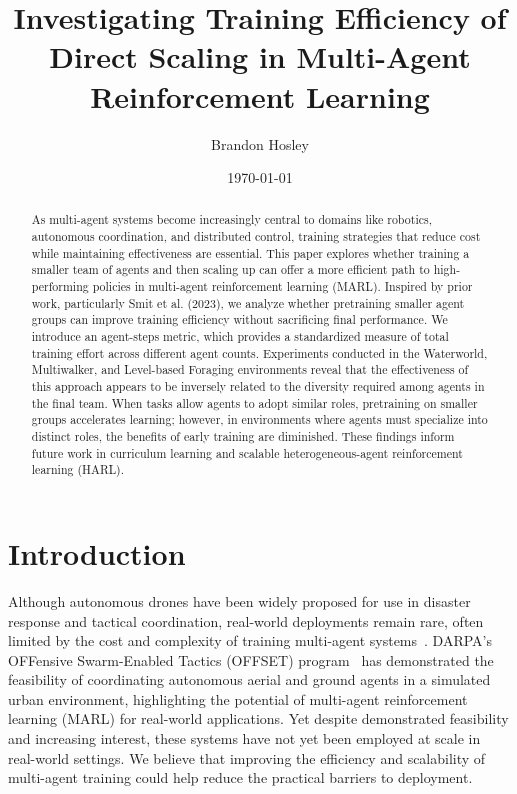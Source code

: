 \documentclass{article}
\title{Investigating Training Efficiency of Direct Scaling in Multi-Agent Reinforcement Learning}
\author{Brandon Hosley}
\date{\today}
\begin{document}
\maketitle

\begin{abstract}
    As multi-agent systems become increasingly central to domains like robotics, 
    autonomous coordination, and distributed control, training strategies 
    that reduce cost while maintaining effectiveness are essential. 
    This paper explores whether training a smaller team of agents and 
    then scaling up can offer a more efficient path to high-performing policies in 
    multi-agent reinforcement learning (MARL).
    Inspired by prior work, particularly Smit et al. (2023), 
    we analyze whether pretraining smaller agent groups can improve training efficiency 
    without sacrificing final performance. 
    We introduce an agent-steps metric, which provides a standardized measure of 
    total training effort across different agent counts.
    Experiments conducted in the Waterworld, Multiwalker, and Level-based Foraging environments 
    reveal that the effectiveness of this approach appears to be inversely related 
    to the diversity required among agents in the final team. 
    When tasks allow agents to adopt similar roles, 
    pretraining on smaller groups accelerates learning; 
    however, in environments where agents must specialize into distinct roles, 
    the benefits of early training are diminished. 
    These findings inform future work in curriculum learning and scalable 
    heterogeneous-agent reinforcement learning (HARL).
\end{abstract}

\section{Introduction}

Although autonomous drones have been widely proposed for use in disaster response and 
tactical coordination, real-world deployments remain rare, often limited by the cost 
and complexity of training multi-agent systems~\cite{jin2025}. 
DARPA's OFFensive Swarm-Enabled Tactics (OFFSET) program~\cite{zotero-2835} 
has demonstrated the feasibility of coordinating autonomous aerial and ground agents 
in a simulated urban environment, highlighting the potential of multi-agent reinforcement 
learning (MARL) for real-world applications. Yet despite demonstrated feasibility and 
increasing interest, these systems have not yet been employed at scale in real-world settings. 
We believe that improving the efficiency and scalability of multi-agent training 
could help reduce the practical barriers to deployment. %
\end{document}
